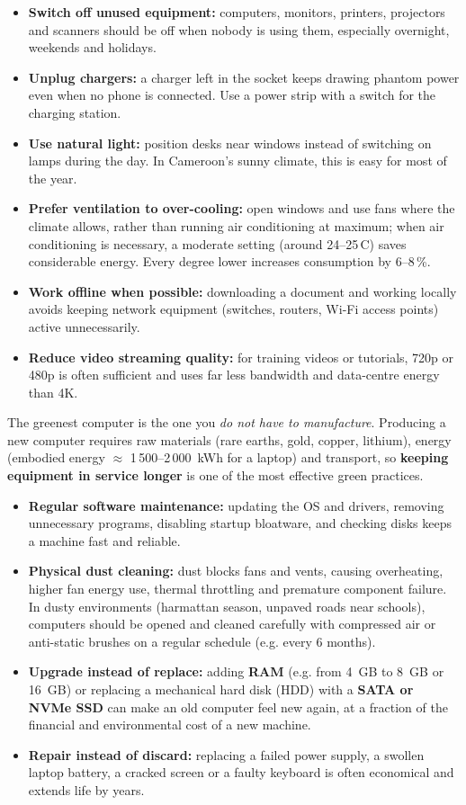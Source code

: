 \documentclass[11pt]{article}
\newcounter{popsec}
\newcounter{popsub}
\newcommand{\courssub}[1]{%
  \stepcounter{popsub}%
  \par\vspace{9pt}\noindent{\popxbold\fontsize{11.5}{13}\selectfont\color{popink}{\color{poporange}\thepopsec.\thepopsub}\hspace{6pt}#1}\par\nopagebreak\vspace{4pt}
}
\begin{document}
\begin{itemize}
\item \textbf{Switch off unused equipment:} computers, monitors, printers, projectors and scanners should be off when nobody is using them, especially overnight, weekends and holidays.
\item \textbf{Unplug chargers:} a charger left in the socket keeps drawing phantom power even when no phone is connected. Use a power strip with a switch for the charging station.
\item \textbf{Use natural light:} position desks near windows instead of switching on lamps during the day. In Cameroon's sunny climate, this is easy for most of the year.
\item \textbf{Prefer ventilation to over-cooling:} open windows and use fans where the climate allows, rather than running air conditioning at maximum; when air conditioning is necessary, a moderate setting (around 24--25\,\textdegree C) saves considerable energy. Every degree lower increases consumption by 6--8\,\%.
\item \textbf{Work offline when possible:} downloading a document and working locally avoids keeping network equipment (switches, routers, Wi-Fi access points) active unnecessarily.
\item \textbf{Reduce video streaming quality:} for training videos or tutorials, 720p or 480p is often sufficient and uses far less bandwidth and data-centre energy than 4K.
\end{itemize}

\courssub{Extending Equipment Lifespan}

The greenest computer is the one you \emph{do not have to manufacture}. Producing a new computer requires raw materials (rare earths, gold, copper, lithium), energy (embodied energy $\approx$ 1\,500--2\,000~kWh for a laptop) and transport, so \textbf{keeping equipment in service longer} is one of the most effective green practices.

\begin{itemize}
\item \textbf{Regular software maintenance:} updating the OS and drivers, removing unnecessary programs, disabling startup bloatware, and checking disks keeps a machine fast and reliable.
\item \textbf{Physical dust cleaning:} dust blocks fans and vents, causing overheating, higher fan energy use, thermal throttling and premature component failure. In dusty environments (harmattan season, unpaved roads near schools), computers should be opened and cleaned carefully with compressed air or anti-static brushes on a regular schedule (e.g. every 6 months).
\item \textbf{Upgrade instead of replace:} adding \textbf{RAM} (e.g. from 4~GB to 8~GB or 16~GB) or replacing a mechanical hard disk (HDD) with a \textbf{SATA or NVMe SSD} can make an old computer feel new again, at a fraction of the financial and environmental cost of a new machine.
\item \textbf{Repair instead of discard:} replacing a failed power supply, a swollen laptop battery, a cracked screen or a faulty keyboard is often economical and extends life by years.
\end{itemize}
\end{document}
